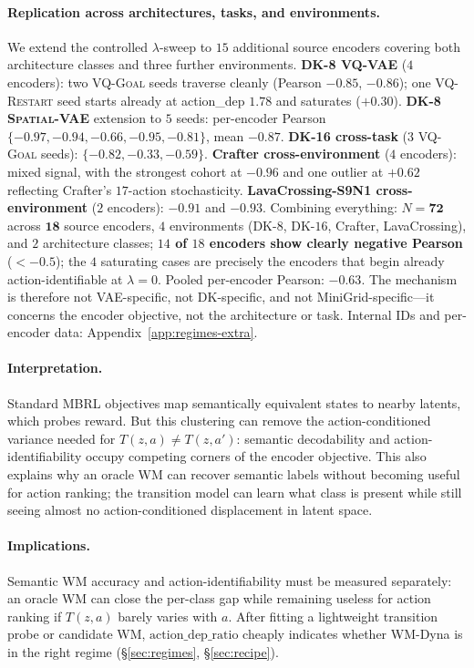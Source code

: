 \documentclass{article}
\newcommand{\encVQRestart}{\textsc{VQ-Restart}}
\newcommand{\encVQGoal}{\textsc{VQ-Goal}}
\newcommand{\encSpatialVAE}{\textsc{Spatial-VAE}}
\begin{document}
\paragraph{Replication across architectures, tasks, and environments.} We extend the controlled $\lambda$-sweep to $15$ additional source encoders covering both architecture classes and three further environments. \textbf{DK-8 VQ-VAE} ($4$ encoders): two \encVQGoal{} seeds traverse cleanly (Pearson $-0.85$, $-0.86$); one \encVQRestart{} seed starts already at action\_dep $1.78$ and saturates ($+0.30$). \textbf{DK-8 \encSpatialVAE} extension to $5$ seeds: per-encoder Pearson $\{-0.97, -0.94, -0.66, -0.95, -0.81\}$, mean $-0.87$. \textbf{DK-16 cross-task} ($3$ \encVQGoal{} seeds): $\{-0.82, -0.33, -0.59\}$. \textbf{Crafter cross-environment} ($4$ encoders): mixed signal, with the strongest cohort at $-0.96$ and one outlier at $+0.62$ reflecting Crafter's $17$-action stochasticity. \textbf{LavaCrossing-S9N1 cross-environment} ($2$ encoders): $-0.91$ and $-0.93$. Combining everything: $N{=}\mathbf{72}$ across $\mathbf{18}$ source encoders, $4$ environments (DK-$8$, DK-$16$, Crafter, LavaCrossing), and $2$ architecture classes; \textbf{$14$ of $18$ encoders show clearly negative Pearson} ($<-0.5$); the $4$ saturating cases are precisely the encoders that begin already action-identifiable at $\lambda{=}0$. Pooled per-encoder Pearson: $\mathbf{-0.63}$. The mechanism is therefore not VAE-specific, not DK-specific, and not MiniGrid-specific---it concerns the encoder objective, not the architecture or task. Internal IDs and per-encoder data: Appendix~\ref{app:regimes-extra}.

\paragraph{Interpretation.} Standard MBRL objectives map semantically equivalent states to nearby latents, which probes reward. But this clustering can remove the action-conditioned variance needed for $T(z,a)\neq T(z,a')$: semantic decodability and action-identifiability occupy competing corners of the encoder objective. This also explains why an oracle WM can recover semantic labels without becoming useful for action ranking; the transition model can learn what class is present while still seeing almost no action-conditioned displacement in latent space.

\paragraph{Implications.} Semantic WM accuracy and action-identifiability must be measured separately: an oracle WM can close the per-class gap while remaining useless for action ranking if $T(z,a)$ barely varies with $a$. After fitting a lightweight transition probe or candidate WM, $\mathrm{action\_dep\_ratio}$ cheaply indicates whether WM-Dyna is in the right regime (\S\ref{sec:regimes}, \S\ref{sec:recipe}).
\end{document}
